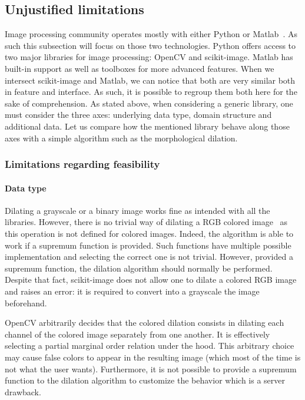 \subsection{Unjustified limitations}
\label{subsec:limitations}

Image processing community operates mostly with either Python or Matlab~\cite{etter.2002.introduction}. As such this
subsection will focus on those two technologies. Python offers access to two major libraries for image processing:
OpenCV and scikit-image. Matlab has built-in support as well as toolboxes for more advanced features. When we intersect
scikit-image and Matlab, we can notice that both are very similar both in feature and interface. As such, it is possible
to regroup them both here for the sake of comprehension. As stated above, when considering a generic library, one must
consider the three axes: underlying data type, domain structure and additional data. Let us compare how the mentioned
library behave along those axes with a simple algorithm such as the morphological dilation.

\subsubsection{Limitations regarding feasibility}

\paragraph{Data type} Dilating a grayscale or a binary image works fine as intended with all the libraries. However,
there is no trivial way of dilating a RGB colored image~\parencite{angulo.2007.morpho_color,dewitte.2005.morpho_color}
as this operation is not defined for colored images. Indeed, the algorithm is able to work if a supremum function is
provided. Such functions have multiple possible implementation and selecting the correct one is not trivial. However,
provided a supremum function, the dilation algorithm should normally be performed. Despite that fact, scikit-image does
not allow one to dilate a colored RGB image and raises an error: it is required to convert into a grayscale the image
beforehand.

OpenCV arbitrarily decides that the colored dilation consists in dilating each channel of the colored image separately
from one another. It is effectively selecting a partial marginal order relation under the hood. This arbitrary choice
may cause false colors to appear in the resulting image (which most of the time is not what the user wants).
Furthermore, it is not possible to provide a supremum function to the dilation algorithm to customize the behavior which
is a server drawback.

